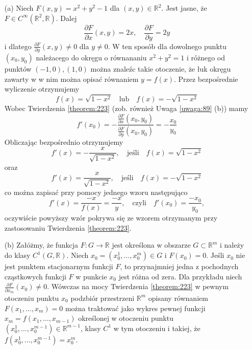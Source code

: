 \documentclass[leqno]{article}
\begin{document}
\begin{justify}
\begin{ex}
    \begin{itemize}
        \item [(a)] Niech $F(x,y) = x^2 + y^2 - 1$ dla $(x,y) \in \mathbb{R}^2$. Jest jasne, że $F \in C^{\infty}(\mathbb{R}^2, \mathbb{R})$. Dalej 
        \[
            \frac{\partial F}{\partial x}(x,y) = 2x, \quad \frac{\partial F}{\partial y} = 2y
        \]
        i dlatego $\frac{\partial F}{\partial y}(x,y) \neq 0$ dla $y \neq 0$. W ten sposób dla dowolnego punktu $(x_0, y_0)$ należacego 
        do okręgu o równananiu $x^2 + y^2 = 1$ i różnego od punktów $(-1, 0), (1, 0)$ można znaleźc takie otoczenie, że łuk okręgu zawarty w
        w nim można opisać równaniem $y = f(x)$. Przez bezpośrednie wyliczenie otrzymujemy 
        \[
            f(x) = \sqrt{1 - x^2} \quad \text{lub}\quad f(x) = -\sqrt{1 - x^2}
        \]
        Wobec Twierdzenia \ref{theorem:223} (zob. również Uwaga \ref{uwaga:89} (b)) mamy 
        \[
            f'(x_0) = -\frac{\frac{\partial F}{\partial x}(x_0, y_0)}{\frac{\partial F}{\partial y}(x_0, y_0)} = -\frac{x_0}{y_0}
        \]
        Obliczając bezpośrednio otrzymujemy 
        \[
            f'(x) = -\frac{x}{\sqrt{1 - x^2}}, \quad \text{jeśli} \quad f(x) = \sqrt{1-x^2}
        \]
        oraz 
        \[
            f'(x) = \frac{x}{\sqrt{1 - x^2}}, \quad \text{jeśli} \quad f(x) = -\sqrt{1-x^2}
        \]
        co można zapisać przy pomocy jednego wzoru następująco 
        \[
            f'(x) = \frac{-x}{f(x)} = \frac{-x}{y}, \quad \text{czyli} \quad f'(x_0) = \frac{-x_0}{y_0},
        \]
        oczywiście powyższy wzór pokrywa się ze wzorem otrzymanym przy zastosowaniu Twierdzenia \ref{theorem:223}.
    \item [(b)]
        Załóżmy, że funkcja $F : G \to \mathbb{R}$ jest określona w obszarze $G \subset \mathbb{R}^m$ i należy do klasy $C^1(G, \mathbb{R})$.
        Niech $x_0 = (x_0^1, \ldots, x_0^m) \in G$ i $F(x_0) = 0$. Jeśli $x_0$ nie jest punktem stacjonarnym funkcji $F$, to przynajmniej jedna z pochodnych cząstkowych funkcji $F$ w punkcie $x_0$ jest różna od zera. Dla przykładu niech $\frac{\partial F}{\partial x_m}(x_0) \neq 0$.
        Wówczas na mocy Twierdzenia \ref{theorem:223} w pewnym otoczeniu punktu $x_0$ podzbiór przestrzeni $\mathbb{R}^m$ opisany równaniem $F(x_1, \ldots, x_m) = 0$
        można traktować jako wykres pewnej funkcji $x_m = f(x_1, \ldots, x_{m-1})$ określonej w otoczeniu punktu $(x_0^1, \ldots, x_0^{m-1}) \in \mathbb{R}^{m-1}$,
        klasy $C^1$ w tym otoczeniu i takiej, że $f(x_0^1, \ldots, x_0^{m-1}) = x_0^m$.

\end{itemize}
\end{ex}
\end{justify}
\end{document}
